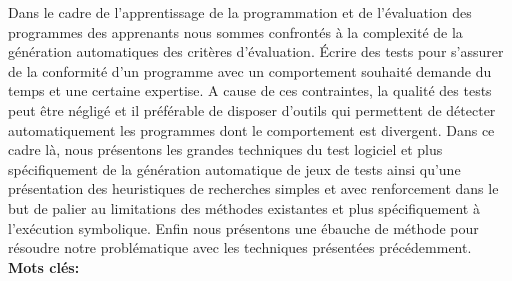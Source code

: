 \documentclass[
12pt, %
french, %
singlespacing, %
headsepline, %
]{MastersDoctoralThesis} %
\begin{document}





\newenvironment{abstract}%
{\cleardoublepage\thispagestyle{empty}\null\vfill\begin{center}%
\bfseries\abstractname\end{center}}%
{\vfill\null}

\begin{abstract}
Dans le cadre de l'apprentissage de la programmation et de l'évaluation des programmes des apprenants nous sommes confrontés à la complexité de la génération automatiques des critères d'évaluation. Écrire des tests pour s'assurer de la conformité d'un programme avec un comportement souhaité demande du temps et une certaine expertise. A cause de ces contraintes, la qualité des tests peut être négligé et il préférable de disposer d'outils qui permettent de détecter automatiquement les programmes dont le comportement est divergent.
Dans ce cadre là, nous présentons les grandes techniques du test logiciel et plus spécifiquement de la génération automatique de jeux de tests ainsi qu'une présentation des heuristiques de recherches simples et avec renforcement dans le but de palier au limitations des méthodes existantes et plus spécifiquement à l'exécution symbolique. Enfin nous présentons une ébauche de méthode pour résoudre notre problématique avec les techniques présentées précédemment.\\

\textbf{Mots clés:} \keywordnames
\end{abstract}
\end{document}
